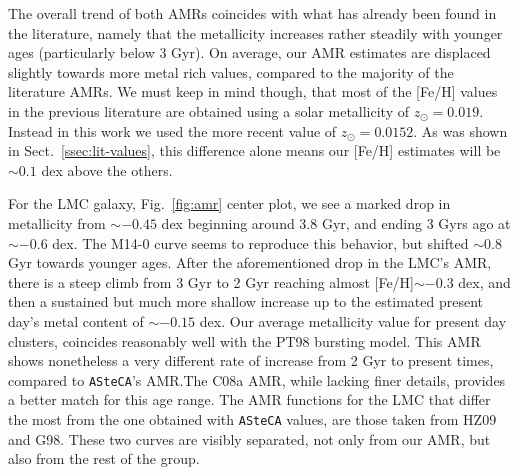 \documentclass{aa}
\begin{document}
The overall trend of both AMRs coincides with what has already been found in the
literature, namely that the metallicity increases rather steadily with younger 
ages (particularly below 3 Gyr). On average, our AMR estimates are displaced
slightly towards more metal rich values, compared to the majority of the
literature AMRs.
We must keep in mind though, that most of the [Fe/H] values in the previous
literature are obtained using a solar metallicity of $z_{\odot}{=}0.019$.
Instead in this work we used the more recent value of $z_{\odot}{=}0.0152$. As
was shown in Sect.~\ref{ssec:lit-values}, this difference alone means our [Fe/H]
estimates will be ${\sim}0.1$ dex above the others.

For the LMC galaxy, Fig.~\ref{fig:amr} center plot, we see a marked
drop in metallicity from ${\sim-}0.45$ dex beginning around 3.8 Gyr, and
ending 3 Gyrs ago at ${\sim-}0.6$ dex. The M14-0 curve seems to reproduce this
behavior, but shifted ${\sim}0.8$ Gyr towards younger ages.
%
%
%
After the aforementioned drop in the LMC's AMR, there is a steep climb from 3
Gyr to 2 Gyr reaching almost [Fe/H]${\sim-}0.3$ dex, and then a sustained but
much more shallow increase up to the estimated present day's metal content of
${\sim-}0.15$ dex.
%
Our average metallicity value for present day clusters, coincides reasonably
well with the PT98 bursting model. This AMR shows nonetheless a very different
rate of increase from 2 Gyr to present times, compared to \texttt{ASteCA}'s
AMR.\@ The C08a AMR, while lacking finer details, provides a better
match for this age range.
The AMR functions for the LMC that differ the most from the one obtained
with \texttt{ASteCA} values, are those taken from HZ09 and G98. These two curves
are visibly separated, not only from our AMR, but also from the rest of the
group.
\end{document}
